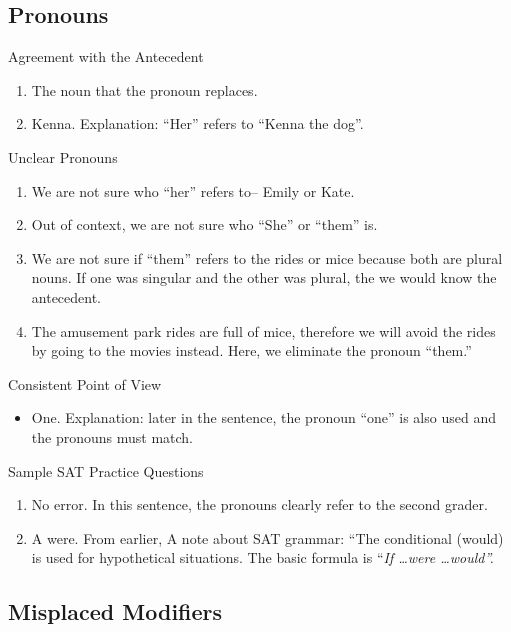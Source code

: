 \subsection{Pronouns}

Agreement with the Antecedent

\begin{enumerate}
\item The noun that the pronoun replaces.

\item Kenna. Explanation: ``Her'' refers to ``Kenna the dog''.
\end{enumerate}

Unclear Pronouns

\begin{enumerate}
\item We are not sure who ``her'' refers to-- Emily or Kate.
\item Out of context, we are not sure who ``She'' or ``them'' is.
\item We are not sure if ``them'' refers to the rides or mice because both are plural nouns. If one was singular and the other was plural, the we would know the antecedent. 
\item The amusement park rides are full of mice, therefore we will avoid the rides by going to the movies instead. Here, we eliminate the pronoun ``them.''
\end{enumerate}

Consistent Point of View

\begin{itemize}
\item One. Explanation: later in the sentence, the pronoun ``one'' is also used and the pronouns must match. 
\end{itemize}

Sample SAT Practice Questions

\begin{enumerate}
\item No error. In this sentence, the pronouns clearly refer to the second grader. 

\item A were. From earlier, A note about SAT grammar: ``The conditional (would) is used for hypothetical situations. The basic formula is ``\textit{If \ldots were \ldots would''.}
\end{enumerate}

\subsection{Misplaced Modifiers}

